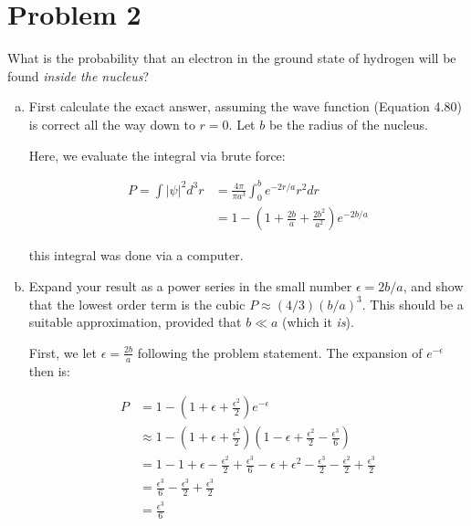 \documentclass[10pt]{article}
\begin{document}
    \pagebreak

    \section*{Problem 2}
    What is the probability that an electron in the ground state of hydrogen will be found \textit{inside the nucleus}?

    \begin{enumerate}[(a)]
        \item First calculate the exact answer, assuming the wave function (Equation 4.80) is correct all the way down to $r = 0$. Let $b$ be the radius of the nucleus. 
        
        \begin{solution}
            Here, we evaluate the integral via brute force: 

            \begin{align*}
                P = \int |\psi|^2 d^3r &= \frac{4\pi}{\pi a^3} \int_0^b e^{-2r/a} r^2 dr\\
                &= 1 - \left(1 + \frac{2b}{a} + \frac{2b^2}{a^2}\right)e^{-2b/a}
            \end{align*}

            this integral was done via a computer.
        \end{solution}
        \item Expand your result as a power series in the small number $\epsilon = 2b/a$, and show that the lowest order term is the cubic $P \approx (4/3)(b/a)^3$. This should be a suitable approximation, provided that $b \ll a$ (which it \textit{is}). 
        
        \begin{solution}
        First, we let $\epsilon = \frac{2b}{a}$ following the problem statement. The expansion of $e^{-\epsilon}$ then is: 


            \begin{align*}
                P &= 1 - \left(1 + \epsilon + \frac{\epsilon^2}{2}\right)e^{-\epsilon} \\
                &\approx 1 - \left(1 + \epsilon + \frac{\epsilon^2}{2}\right)\left(1 - \epsilon + \frac{\epsilon^2}{2} - \frac{\epsilon^3}{6}\right)\\
                &= 1 - 1 + \epsilon - \frac{\epsilon^2}{2} + \frac{\epsilon^3}{6} - \epsilon + \epsilon^2 - \frac{\epsilon^3}{2} - \frac{\epsilon^2}{2} + \frac{\epsilon^3}{2}\\
                &= \frac{\epsilon^3}{6} - \frac{\epsilon^3}{2} + \frac{\epsilon^3}{2}\\
                &= \frac{\epsilon^3}{6}
            \end{align*}


\end{solution}
\end{enumerate}
\end{document}
